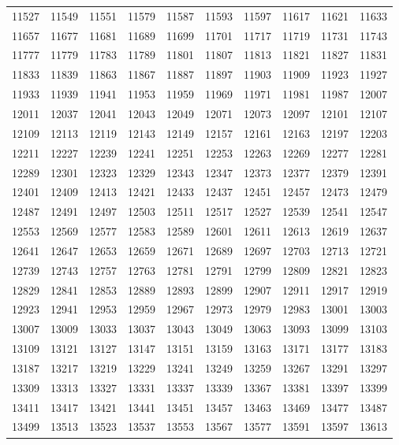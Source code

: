 \begin{longtable}{llllllllll}
11527	&	11549	&	11551	&	11579	&	11587	&	11593	&	11597	&	11617	&	11621	&	11633	\\
11657	&	11677	&	11681	&	11689	&	11699	&	11701	&	11717	&	11719	&	11731	&	11743	\\
11777	&	11779	&	11783	&	11789	&	11801	&	11807	&	11813	&	11821	&	11827	&	11831	\\
11833	&	11839	&	11863	&	11867	&	11887	&	11897	&	11903	&	11909	&	11923	&	11927	\\
11933	&	11939	&	11941	&	11953	&	11959	&	11969	&	11971	&	11981	&	11987	&	12007	\\
12011	&	12037	&	12041	&	12043	&	12049	&	12071	&	12073	&	12097	&	12101	&	12107	\\
12109	&	12113	&	12119	&	12143	&	12149	&	12157	&	12161	&	12163	&	12197	&	12203	\\
12211	&	12227	&	12239	&	12241	&	12251	&	12253	&	12263	&	12269	&	12277	&	12281	\\
12289	&	12301	&	12323	&	12329	&	12343	&	12347	&	12373	&	12377	&	12379	&	12391	\\
12401	&	12409	&	12413	&	12421	&	12433	&	12437	&	12451	&	12457	&	12473	&	12479	\\
12487	&	12491	&	12497	&	12503	&	12511	&	12517	&	12527	&	12539	&	12541	&	12547	\\
12553	&	12569	&	12577	&	12583	&	12589	&	12601	&	12611	&	12613	&	12619	&	12637	\\
12641	&	12647	&	12653	&	12659	&	12671	&	12689	&	12697	&	12703	&	12713	&	12721	\\
12739	&	12743	&	12757	&	12763	&	12781	&	12791	&	12799	&	12809	&	12821	&	12823	\\
12829	&	12841	&	12853	&	12889	&	12893	&	12899	&	12907	&	12911	&	12917	&	12919	\\
12923	&	12941	&	12953	&	12959	&	12967	&	12973	&	12979	&	12983	&	13001	&	13003	\\
13007	&	13009	&	13033	&	13037	&	13043	&	13049	&	13063	&	13093	&	13099	&	13103	\\
13109	&	13121	&	13127	&	13147	&	13151	&	13159	&	13163	&	13171	&	13177	&	13183	\\
13187	&	13217	&	13219	&	13229	&	13241	&	13249	&	13259	&	13267	&	13291	&	13297	\\
13309	&	13313	&	13327	&	13331	&	13337	&	13339	&	13367	&	13381	&	13397	&	13399	\\
13411	&	13417	&	13421	&	13441	&	13451	&	13457	&	13463	&	13469	&	13477	&	13487	\\
13499	&	13513	&	13523	&	13537	&	13553	&	13567	&	13577	&	13591	&	13597	&	13613	\\

\end{longtable}
